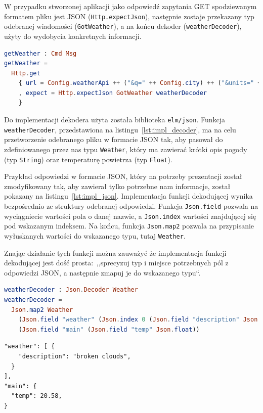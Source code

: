 \documentclass[twoside,a4paper]{report}
\begin{document}
W przypadku stworzonej aplikacji jako odpowiedź zapytania GET spodziewanym formatem pliku jest JSON (\texttt{Http.expectJson}), następnie zostaje przekazany typ odebranej wiadomości (\texttt{GotWeather}), a na końcu dekoder (\texttt{weatherDecoder}), użyty do wydobycia konkretnych informacji.
\begin{lstlisting}[mathescape,caption={Implementacja funkcji \texttt{getWeather}},label={lst:impl_weather},language={Elm}]
getWeather : Cmd Msg
getWeather =
  Http.get
    { url = Config.weatherApi ++ ("&q=" ++ Config.city) ++ ("&units=" ++ Config.unit) ++ ("&appid=" ++ Config.apiKey)
    , expect = Http.expectJson GotWeather weatherDecoder
    }
\end{lstlisting}

Do implementacji dekodera użyta została biblioteka \texttt{elm/json}.
Funkcja \texttt{weatherDecoder}, przedstawiona na listingu~\ref{lst:impl_decoder}, ma na celu przetworzenie odebranego pliku w formacie JSON tak, aby pasował do zdefiniowanego przez nas typu \texttt{Weather}, który ma zawierać krótki opis pogody (typ \texttt{String}) oraz temperaturę powietrza (typ \texttt{Float}).

Przykład odpowiedzi w formacie JSON, który na potrzeby prezentacji został zmodyfikowany tak, aby zawierał tylko potrzebne nam informacje, został pokazany na listingu~\ref{lst:impl_json}.
Implementacja funkcji dekodującej wynika bezpośrednio ze struktury odebranej odpowiedzi.
Funkcja \texttt{Json.field} pozwala na wyciągniecie wartości pola o danej nazwie, a \texttt{Json.index} wartości znajdującej się pod wskazanym indeksem.
Na końcu, funkcja \texttt{Json.map2} pozwala na przypisanie wyłuskanych wartości do wskazanego typu, tutaj \texttt{Weather}.

Znając działanie tych funkcji można zauważyć że implementacja funkcji dekodującej jest dość prosta:~,,sprecyzuj typ i miejsce potrzebnych pól z odpowiedzi JSON, a następnie zmapuj je do wskazanego typu``.

\begin{lstlisting}[mathescape,caption={Implementacja dekodera JSON},label={lst:impl_decoder},language={Elm}]
weatherDecoder : Json.Decoder Weather
weatherDecoder =
  Json.map2 Weather
    (Json.field "weather" (Json.index 0 (Json.field "description" Json.string)))
    (Json.field "main" (Json.field "temp" Json.float))
\end{lstlisting}
\begin{lstlisting}[mathescape,caption={Przykład odebranego zapytania GET w formacie JSON},label={lst:impl_json}]
"weather": [ {
    "description": "broken clouds",
  }
],
"main": {
  "temp": 20.58,
}
\end{lstlisting}
\end{document}
